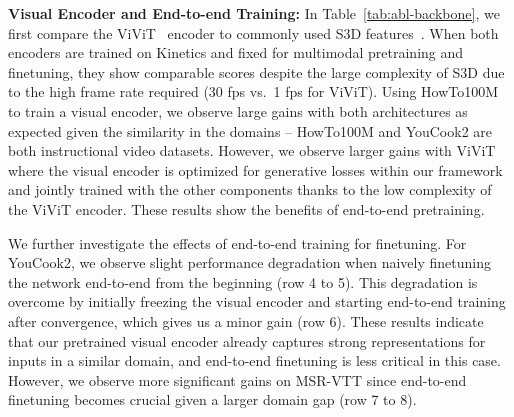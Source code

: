 \documentclass[10pt,twocolumn,letterpaper]{article}
\begin{document}
\noindent\textbf{Visual Encoder and End-to-end Training:}
In Table~\ref{tab:abl-backbone}, we first compare the ViViT~\cite{arnab2021vivit} encoder to commonly used S3D features~\cite{xie2018rethinking}.
When both encoders are trained on Kinetics and fixed for multimodal pretraining and finetuning, they show comparable scores despite the large complexity of S3D due to the high frame rate required (30 fps vs.\ 1 fps for ViViT).
Using HowTo100M to train a visual encoder, we observe large gains with both architectures as expected given the similarity in the domains -- HowTo100M and YouCook2 are both instructional video datasets.
However, we observe larger gains with ViViT where the visual encoder is optimized for  generative losses within our framework and jointly trained with the other components thanks to the low complexity of the ViViT encoder. 
These results show the benefits of end-to-end pretraining.


We further investigate the effects of end-to-end training for finetuning. 
For YouCook2, we observe slight performance degradation when naively finetuning the network end-to-end from the beginning (row 4 to 5).
This degradation is overcome by initially freezing the visual encoder and starting end-to-end training after convergence, which gives us a minor gain (row 6).
These results indicate that our pretrained visual encoder already captures strong representations for inputs in a similar domain, and end-to-end finetuning is less critical in this case.
However, we observe more significant gains on MSR-VTT since end-to-end finetuning becomes crucial given a larger domain gap (row 7 to 8).

\begin{table}[t]

\vspace{-0.1cm}
    \centering
    \caption{Ablations on YouCook2 showing the effect of initialization and pretraining. \textbf{Public Weights}: Initialization with public BERT, GPT-2 and ViViT weights.
} 
    \label{tab:scratch}
\end{table}
\end{document}
